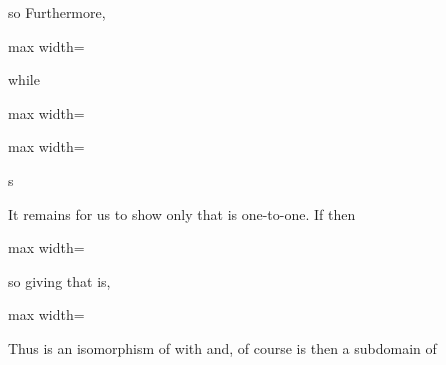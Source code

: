 \documentclass[11pt,oneside]{article}
\begin{document}
\begin{BookBody}

\noindent so  Furthermore,

\begin{center}\begin{adjustbox}{max width=\linewidth}\end{adjustbox}\end{center}

\noindent while

\begin{center}\begin{adjustbox}{max width=\linewidth}\end{adjustbox}\end{center}

\begin{center}\begin{adjustbox}{max width=\linewidth}\end{adjustbox}\end{center}

\noindent s

It remains for us to show only that  is one-to-one. If  then

\begin{center}\begin{adjustbox}{max width=\linewidth}\BookInline{\displaystyle [(a,\allowbreak 1)]= [(b,\allowbreak 1)],\allowbreak }\end{adjustbox}\end{center}

\noindent so  giving  that is,

\begin{center}\begin{adjustbox}{max width=\linewidth}\end{adjustbox}\end{center}

\noindent Thus  is an isomorphism of  with  and, of course is then a subdomain of \BookEnd{\blacklozenge}


\end{BookBody}
\end{document}
